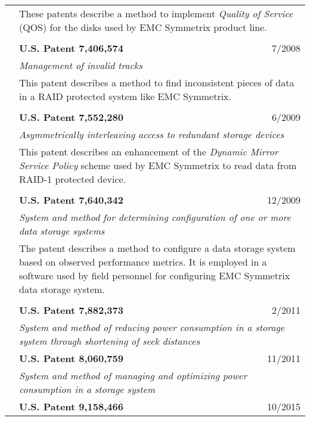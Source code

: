 \documentclass[10pt]{article}
\begin{document}
\begin{longtable}{p{ 90pt}p{299pt}r}
                    & \multicolumn{2}{p{4.5in}}{These patents describe a method to implement {\em Quality of Service} (QOS) for the disks used by
						EMC Symmetrix product line.}\\
\\
                    & {\bf U.S. Patent 7,406,574} & 7/2008 \\
                    & \multicolumn{2}{p{4.5in}}{\em Management of invalid tracks} \\
                    & \multicolumn{2}{p{4.5in}}{This patent describes a method to find inconsistent pieces of data in a RAID protected system like
						EMC Symmetrix.}\\
\\
                    & {\bf U.S. Patent 7,552,280} & 6/2009 \\
                    & \multicolumn{2}{p{4.5in}}{\em Asymmetrically interleaving access to redundant storage devices} \\
                    & \multicolumn{2}{p{4.5in}}{This patent describes an enhancement of the {\em Dynamic Mirror Service Policy} scheme used
						by EMC Symmetrix to read data from RAID-1 protected device.}\\
\\
                    & {\bf U.S. Patent 7,640,342} & 12/2009 \\
                    & \multicolumn{2}{p{4.5in}}{\em System and method for determining configuration of one or more data storage systems} \\
                    & \multicolumn{2}{p{4.5in}}{The patent describes a method to configure a data storage system based on observed performance 
						metrics. It is employed  in a software used by field personnel for configuring EMC Symmetrix 
						data storage system.} \\
\\
                    & {\bf U.S. Patent 7,882,373} & 2/2011 \\
                    & \multicolumn{2}{p{4.5in}}{\em System and method of reducing power consumption in a storage system through shortening of seek distances} \\
                    & {\bf U.S. Patent 8,060,759} & 11/2011 \\
                    & \multicolumn{2}{p{4.5in}}{\em System and method of managing and optimizing power consumption in a storage system} \\
                    & {\bf U.S. Patent 9,158,466} & 10/2015 \\

\end{longtable}
\end{document}
